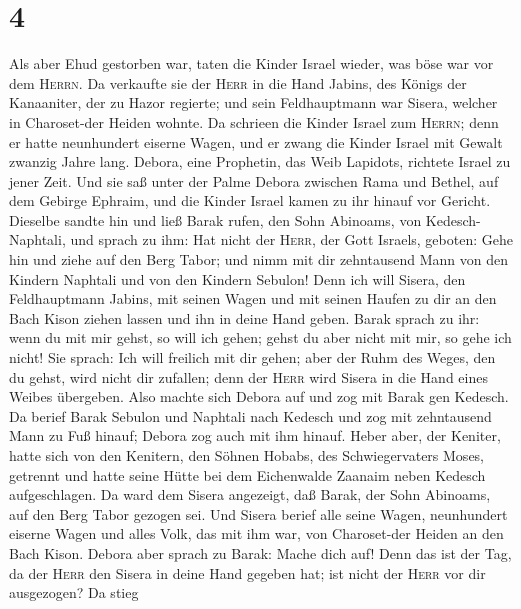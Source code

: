 \hypertarget{section-3}{%
\section{4}\label{section-3}}

 Als aber Ehud gestorben war, taten die Kinder Israel
wieder, was böse war vor dem \textsc{Herrn}.  Da verkaufte
sie der \textsc{Herr} in die Hand Jabins, des Königs der Kanaaniter, der
zu Hazor regierte; und sein Feldhauptmann war Sisera, welcher in
Charoset-der Heiden wohnte.  Da schrieen die Kinder Israel
zum \textsc{Herrn}; denn er hatte neunhundert eiserne Wagen, und er
zwang die Kinder Israel mit Gewalt zwanzig Jahre lang. 
Debora, eine Prophetin, das Weib Lapidots, richtete Israel zu jener
Zeit.  Und sie saß unter der Palme Debora zwischen Rama
und Bethel, auf dem Gebirge Ephraim, und die Kinder Israel kamen zu ihr
hinauf vor Gericht.  Dieselbe sandte hin und ließ Barak
rufen, den Sohn Abinoams, von Kedesch-Naphtali, und sprach zu ihm: Hat
nicht der \textsc{Herr}, der Gott Israels, geboten: Gehe hin und ziehe
auf den Berg Tabor; und nimm mit dir zehntausend Mann von den Kindern
Naphtali und von den Kindern Sebulon!  Denn ich will
Sisera, den Feldhauptmann Jabins, mit seinen Wagen und mit seinen Haufen
zu dir an den Bach Kison ziehen lassen und ihn in deine Hand geben.
 Barak sprach zu ihr: wenn du mit mir gehst, so will ich
gehen; gehst du aber nicht mit mir, so gehe ich nicht! 
Sie sprach: Ich will freilich mit dir gehen; aber der Ruhm des Weges,
den du gehst, wird nicht dir zufallen; denn der \textsc{Herr} wird
Sisera in die Hand eines Weibes übergeben. Also machte sich Debora auf
und zog mit Barak gen Kedesch.  Da berief Barak Sebulon
und Naphtali nach Kedesch und zog mit zehntausend Mann zu Fuß hinauf;
Debora zog auch mit ihm hinauf.  Heber aber, der Keniter,
hatte sich von den Kenitern, den Söhnen Hobabs, des Schwiegervaters
Moses, getrennt und hatte seine Hütte bei dem Eichenwalde Zaanaim neben
Kedesch aufgeschlagen.  Da ward dem Sisera angezeigt, daß
Barak, der Sohn Abinoams, auf den Berg Tabor gezogen sei.
 Und Sisera berief alle seine Wagen, neunhundert eiserne
Wagen und alles Volk, das mit ihm war, von Charoset-der Heiden an den
Bach Kison.  Debora aber sprach zu Barak: Mache dich auf!
Denn das ist der Tag, da der \textsc{Herr} den Sisera in deine Hand
gegeben hat; ist nicht der \textsc{Herr} vor dir ausgezogen? Da stieg
